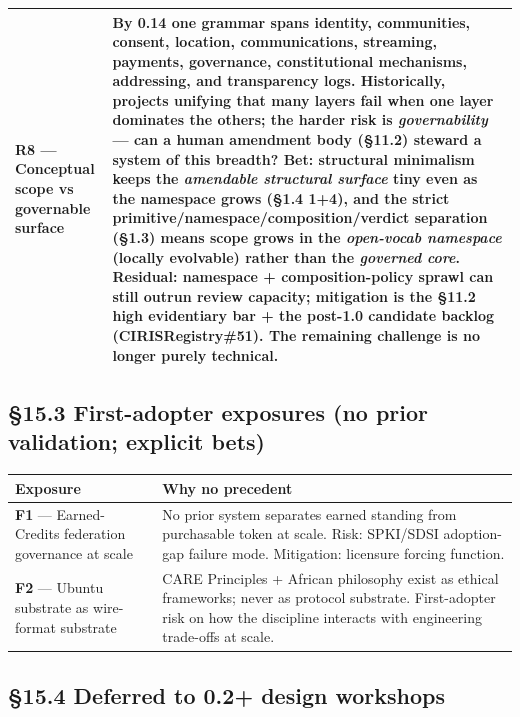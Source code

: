 \documentclass[11pt]{article}
\begin{document}
{\begin{longtable}{|p{8.0cm}|p{8.0cm}|}
\textbf{R8} — Conceptual scope vs governable surface & By 0.14 one grammar spans identity, communities, consent, location, communications, streaming, payments, governance, constitutional mechanisms, addressing, and transparency logs. Historically, projects unifying that many layers fail when one layer dominates the others; the harder risk is \textit{governability} — can a human amendment body (§11.2) steward a system of this breadth? \textbf{Bet}: structural minimalism keeps the \textit{amendable structural surface} tiny even as the namespace grows (§1.4 1+4), and the strict primitive/namespace/composition/verdict separation (§1.3) means scope grows in the \textit{open-vocab namespace} (locally evolvable) rather than the \textit{governed core}. \textbf{Residual}: namespace + composition-policy sprawl can still outrun review capacity; mitigation is the §11.2 high evidentiary bar + the post-1.0 candidate backlog (CIRISRegistry\#51). The remaining challenge is no longer purely technical. \\ \hline
\end{longtable}}


\subsection*{§15.3 First-adopter exposures (no prior validation; explicit bets)}


{\footnotesize
\begin{longtable}{|p{8.0cm}|p{8.0cm}|}\hline
\textbf{Exposure} & \textbf{Why no precedent} \\ \hline\endhead
\textbf{F1} — Earned-Credits federation governance at scale & No prior system separates earned standing from purchasable token at scale. Risk: SPKI/SDSI adoption-gap failure mode. Mitigation: licensure forcing function. \\ \hline
\textbf{F2} — Ubuntu substrate as wire-format substrate & CARE Principles + African philosophy exist as ethical frameworks; never as protocol substrate. First-adopter risk on how the discipline interacts with engineering trade-offs at scale. \\ \hline
\end{longtable}}


\subsection*{§15.4 Deferred to 0.2+ design workshops}
\end{document}
